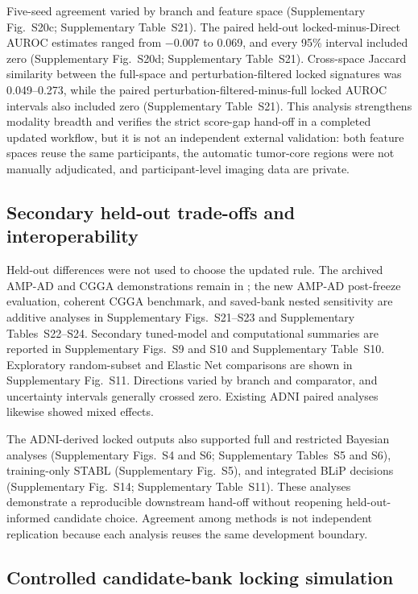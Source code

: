 Five-seed agreement varied by branch and feature space (Supplementary Fig.~S20c; Supplementary Table~S21). The paired held-out locked-minus-Direct AUROC estimates ranged from \(-0.007\) to 0.069, and every 95\% interval included zero (Supplementary Fig.~S20d; Supplementary Table~S21). Cross-space Jaccard similarity between the full-space and perturbation-filtered locked signatures was 0.049--0.273, while the paired perturbation-filtered-minus-full locked AUROC intervals also included zero (Supplementary Table~S21). This analysis strengthens modality breadth and verifies the strict score-gap hand-off in a completed updated workflow, but it is not an independent external validation: both feature spaces reuse the same participants, the automatic tumor-core regions were not manually adjudicated, and participant-level imaging data are private.

\subsection{Secondary held-out trade-offs and interoperability}

Held-out differences were not used to choose the updated rule. The archived AMP-AD and CGGA demonstrations remain in ; the new AMP-AD post-freeze evaluation, coherent CGGA benchmark, and saved-bank nested sensitivity are additive analyses in Supplementary Figs.~S21--S23 and Supplementary Tables~S22--S24. Secondary tuned-model and computational summaries are reported in Supplementary Figs.~S9 and S10 and Supplementary Table~S10. Exploratory random-subset and Elastic Net comparisons are shown in Supplementary Fig.~S11. Directions varied by branch and comparator, and uncertainty intervals generally crossed zero. Existing ADNI paired analyses likewise showed mixed effects.

The ADNI-derived locked outputs also supported full and restricted Bayesian analyses (Supplementary Figs.~S4 and S6; Supplementary Tables~S5 and S6), training-only STABL (Supplementary Fig.~S5), and integrated BLiP decisions (Supplementary Fig.~S14; Supplementary Table~S11). These analyses demonstrate a reproducible downstream hand-off without reopening held-out-informed candidate choice. Agreement among methods is not independent replication because each analysis reuses the same development boundary.

\subsection{Controlled candidate-bank locking simulation}

